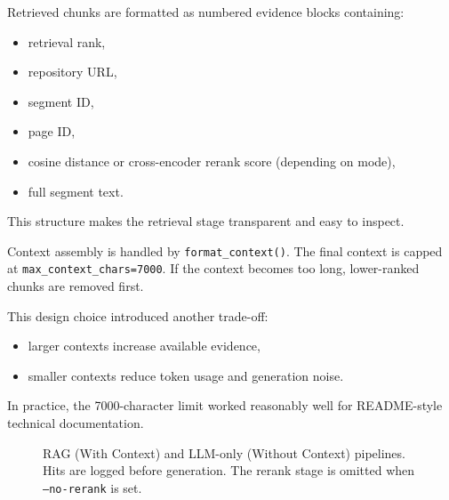 \documentclass[11pt,a4paper]{article}
\begin{document}
Retrieved chunks are formatted as numbered evidence blocks containing:

\begin{itemize}
  \item retrieval rank,
  \item repository URL,
  \item segment ID,
  \item page ID,
  \item cosine distance or cross-encoder rerank score (depending on mode),
  \item full segment text.
\end{itemize}

This structure makes the retrieval stage transparent and easy to inspect.

Context assembly is handled by \texttt{format\_context()}. The final context is capped at \texttt{max\_context\_chars=7000}. If the context becomes too long, lower-ranked chunks are removed first.

This design choice introduced another trade-off:

\begin{itemize}
  \item larger contexts increase available evidence,
  \item smaller contexts reduce token usage and generation noise.
\end{itemize}

In practice, the 7000-character limit worked reasonably well for README-style technical documentation.

\begin{figure}[ht]
\centering
{}
\caption{RAG (With Context) and LLM-only (Without Context) pipelines. Hits are logged before generation. The rerank stage is omitted when \texttt{--no-rerank} is set.}
\label{fig:pipeline}
\end{figure}
\end{document}
